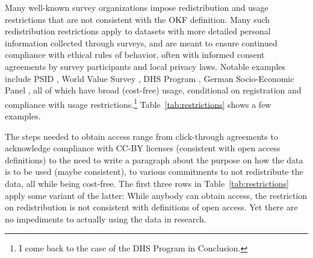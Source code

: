 \documentclass{article}
\begin{document}
Many well-known survey organizations impose redistribution and usage restrictions that are not consistent with the OKF definition. Many such redistribution restrictions apply to datasets with more detailed personal information collected through surveys, and are meant to ensure continued compliance with ethical rules of behavior, often with informed consent agreements by survey participants and local privacy laws. Notable examples include  PSID \parencite{institute_for_social_research_panel_2024}, World Value Survey \parencite{haerpfer_world_2024}, \ac{DHS} Program \parencite{dhs_program_demographic_2024}, German Socio-Economic Panel \parencite{goebel_german_2019,goebel_socio-economic_2024}, all of which have broad (cost-free) usage, conditional on registration and compliance with usage restrictions.\footnote{I come back to the case of the \ac{DHS} Program in Conclusion.} Table~\ref{tab:restrictions} shows a few examples. 



The steps needed to obtain access range from click-through agreements to acknowledge compliance with CC-BY licenses (consistent with open access definitions) to the need to write a paragraph about the purpose on how the data is to be used (maybe consistent), to various commitments to not redistribute the data, all while being cost-free. The first three rows in Table~\ref{tab:restrictions} apply some variant of the latter: While anybody can obtain access, the restriction on redistribution is not consistent with definitions of open access. Yet there are no impediments to actually using the data in research. 
\end{document}
